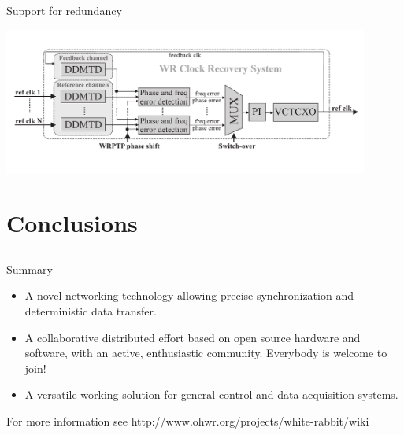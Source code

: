\documentclass[compress, red]{beamer}
\begin{document}
\begin{frame}{Support for redundancy}
 \begin{center}
   \includegraphics[width=0.9\textwidth]{robustness/wrCRS.pdf}
   \end{center}
\end{frame}


\section{Conclusions}
\subsection{}

\begin{frame}{Summary}
 \begin{itemize}
  \pause  
  \item A novel networking technology allowing precise synchronization
    and deterministic data transfer.
  \pause
\item A collaborative distributed effort based on open source hardware
  and software, with an active, enthusiastic community. Everybody is
  welcome to join!  \pause
   \item A versatile working solution for general control and data
    acquisition systems.
 \end{itemize}
 \pause
For more information see http://www.ohwr.org/projects/white-rabbit/wiki
\end{frame}
\end{document}
